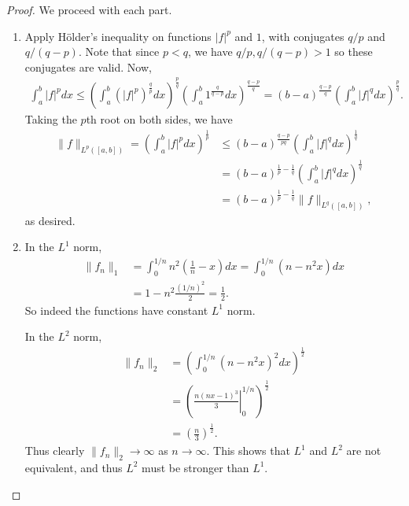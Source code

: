 \documentclass[12pt]{article}
\theoremstyle{remark}
\theoremstyle{named}
\begin{document}
\begin{proof}
    We proceed with each part.
    \begin{enumerate}
        \item Apply H\"older's inequality on functions \(|f|^p\) and \(1\), with conjugates \(q / p\) and \(q / (q - p)\). Note that since \(p < q\), we have \(q / p, q / (q - p) > 1\) so these conjugates are valid. Now,
        \begin{align*}
            \int_{a}^{b} |f|^p dx \leq \left(\int_{a}^{b} (|f|^p)^{\frac{q}{p}} dx \right)^{\frac{p}{q}} \left(\int_{a}^{b} 1^{\frac{q}{q - p}} dx \right)^{\frac{q - p}{q}} = (b - a)^{\frac{q - p}{q}}\left(\int_{a}^{b} |f|^q dx \right)^{\frac{p}{q}}.
        \end{align*}
        Taking the \(p\)th root on both sides, we have
        \begin{align*}
            \|f\|_{L^p([a, b])} = \left(\int_{a}^{b} |f|^p dx\right)^\frac{1}{p} &\leq (b - a)^{\frac{q - p}{pq}}\left(\int_{a}^{b} |f|^q dx \right)^{\frac{1}{q}} \\ 
            &= (b - a)^{\frac{1}{p} - \frac{1}{q}}\left(\int_{a}^{b} |f|^q dx \right)^{\frac{1}{q}} \\
            &= (b - a)^{\frac{1}{p} - \frac{1}{q}} \|f\|_{L^q([a, b])},
        \end{align*}
        as desired.
        \item In the \(L^1\) norm, 
        \begin{align*}
            \|f_n\|_1 &= \int_{0}^{1/n} n^2 \left(\frac{1}{n} - x\right) dx = \int_{0}^{1/n} (n - n^2 x) dx \\
            &= 1 - n^2 \frac{(1/n)^2}{2} = \frac{1}{2}.
        \end{align*}
        So indeed the functions have constant \(L^1\) norm.

        In the \(L^2\) norm, 
        \begin{align*}
            \|f_n\|_2 &= \left(\int_{0}^{1/n} (n - n^2 x)^2 dx \right)^\frac{1}{2} \\
            &= \left(\left . \frac{n(nx - 1)^3}{3}\right |_0^{1/n}\right)^\frac{1}{2} \\
            &= \left(\frac{n}{3}\right)^\frac{1}{2}.
        \end{align*}
        Thus clearly \(\|f_n\|_2 \to \infty\) as \(n \to \infty\). This shows that \(L^1\) and \(L^2\) are not equivalent, and thus \(L^2\) must be stronger than \(L^1\).
    \end{enumerate}
\end{proof}
\end{document}
